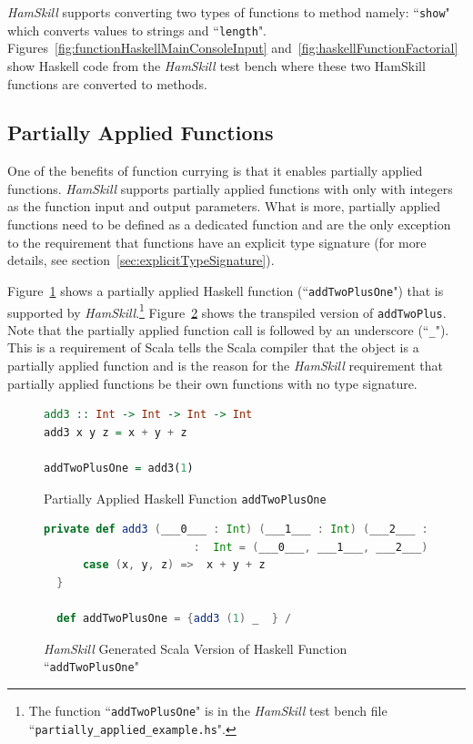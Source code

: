 \documentclass{report}
\begin{document}
\textit{HamSkill} supports converting two types of functions to method namely: ``\texttt{show}" which converts values to strings and ``\texttt{length}".  Figures~\ref{fig:functionHaskellMainConsoleInput} and~\ref{fig:haskellFunctionFactorial} show Haskell code from the \textit{HamSkill} test bench where these two HamSkill functions are converted to methods.

\subsection{Partially Applied Functions}\label{sec:partiallyAppliedFunctions}

One of the benefits of function currying is that it enables partially applied functions.  \textit{HamSkill} supports partially applied functions with only with integers as the function input and output parameters.  What is more, partially applied functions need to be defined as a dedicated function and are the only exception to the requirement that functions have an explicit type signature (for more details, see section~\ref{sec:explicitTypeSignature}).  

Figure~\ref{fig:haskellFunctionAddTwoPlusOne} shows a partially applied Haskell function (``\texttt{addTwoPlusOne}") that is supported by \textit{HamSkill}.\footnote{The function ``\texttt{addTwoPlusOne}" is in the \textit{HamSkill} test bench file ``\texttt{partially\_applied\_example.hs}".}  Figure~\ref{fig:scalaFunctionAddTwoPlusOne} shows the transpiled version of \texttt{addTwoPlus}.  Note that the partially applied function call is followed by an underscore (``\texttt{\_}").  This is a requirement of Scala tells the Scala compiler that the object is a partially applied function and is the reason for the \textit{HamSkill} requirement that partially applied functions be their own functions with no type signature.

\begin{figure}[H]
\begin{mdframed}
\begin{lstlisting}[language=Haskell]
add3 :: Int -> Int -> Int -> Int
add3 x y z = x + y + z

addTwoPlusOne = add3(1)
\end{lstlisting}
\end{mdframed}
\caption{Partially Applied Haskell Function \texttt{addTwoPlusOne}}\label{fig:haskellFunctionAddTwoPlusOne}
\end{figure}

\begin{figure}[H]
\begin{mdframed}
\begin{lstlisting}[language=Scala, basicstyle=\scriptsize]
  private def add3 (___0___ : Int) (___1___ : Int) (___2___ : Int) 
                       :  Int = (___0___, ___1___, ___2___) match {
      case (x, y, z) =>  x + y + z
  } 

  def addTwoPlusOne = {add3 (1) _  } /
\end{lstlisting}
\end{mdframed}
\caption{\textit{HamSkill} Generated Scala Version of Haskell Function ``\texttt{addTwoPlusOne}"}\label{fig:scalaFunctionAddTwoPlusOne}
\end{figure}
\end{document}
